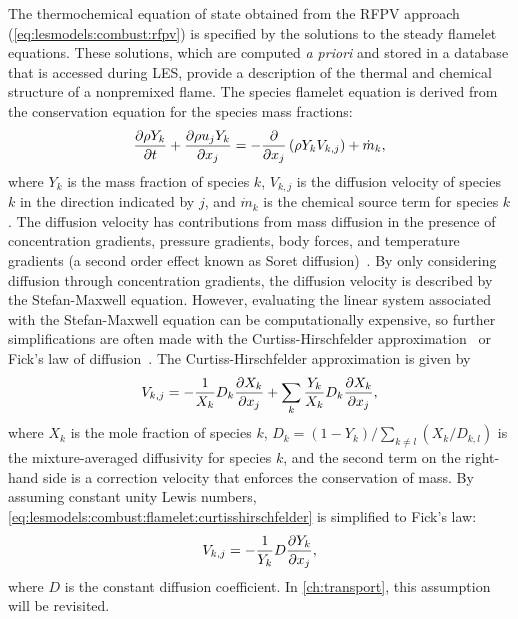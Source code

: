 The thermochemical equation of state obtained from the RFPV approach (\cref{eq:lesmodels:combust:rfpv}) is specified by the solutions to the steady flamelet equations. These solutions, which are computed \textit{a priori} and stored in a database that is accessed during LES, provide a description of the thermal and chemical structure of a nonpremixed flame. The species flamelet equation is derived from the conservation equation for the species mass fractions:
\begin{equation}\label{eq:lesmodels:combust:flamelet:consy}
  \trder{Y_k} = -\pder[]{x_j}\left( \rho Y_k V_{k,j} \right) + \dot{m}_k,
\end{equation}
where $Y_k$ is the mass fraction of species $k$, $V_{k,j}$ is the diffusion velocity of species $k$ in the direction indicated by $j$, and $\dot{m}_k$ is the chemical source term for species $k$. The diffusion velocity has contributions from mass diffusion in the presence of concentration gradients, pressure gradients, body forces, and temperature gradients (a second order effect known as Soret diffusion)~\cite{law2006}. By only considering diffusion through concentration gradients, the diffusion velocity is described by the Stefan-Maxwell equation. However, evaluating the linear system associated with the Stefan-Maxwell equation can be computationally expensive, so further simplifications are often made with the Curtiss-Hirschfelder approximation~\cite{curtiss1949} or Fick's law of diffusion~\cite{fick1855}. The Curtiss-Hirschfelder approximation is given by
\begin{equation}\label{eq:lesmodels:combust:flamelet:curtisshirschfelder}
  V_{k,j} = -\frac{1}{X_k}D_k\pder[X_k]{x_j} + \sum\limits_{k} \frac{Y_k}{X_k}D_k\pder[X_k]{x_j},
\end{equation}
where $X_k$ is the mole fraction of species $k$, $D_k = (1 - Y_k)/\sum\limits_{k \neq l} (X_k/D_{k,l})$ is the mixture-averaged diffusivity for species $k$, and the second term on the right-hand side is a correction velocity that enforces the conservation of mass. By assuming constant unity Lewis numbers, \cref{eq:lesmodels:combust:flamelet:curtisshirschfelder} is simplified to Fick's law:
\begin{equation}\label{eq:lesmodels:combust:flamelet:fick}
  V_{k,j} = -\frac{1}{Y_k}D\pder[Y_k]{x_j},
\end{equation}
where $D$ is the constant diffusion coefficient. In \cref{ch:transport}, this assumption will be revisited.


